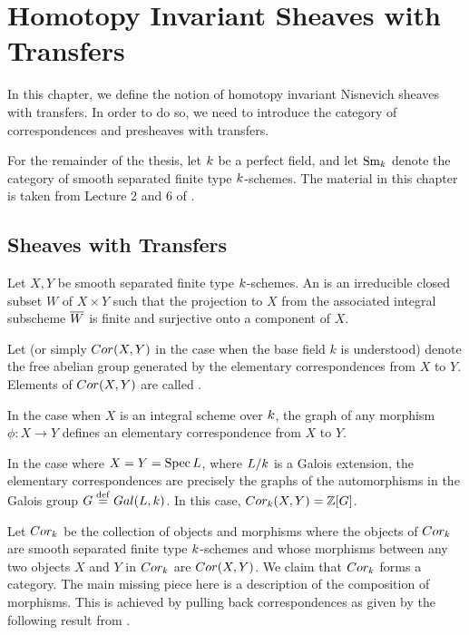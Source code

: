 \newpage
\chapter{Homotopy Invariant Sheaves with Transfers}\label{sect_hist}

In this chapter, we define the notion of homotopy invariant
Nisnevich sheaves with transfers. In order to do so, we need to
introduce the category of correspondences and presheaves with 
transfers. 

For the remainder of the thesis, let $k$ be a perfect 
field, and let $\mathrm{Sm}_{k}$ denote the category of smooth separated 
finite type $k$-schemes. The material in this chapter is 
taken from Lecture 2 and 6 of \cite{MVW}.

\section{Sheaves with Transfers}

\begin{defn}\label{def_cor}
Let $X, Y$ be smooth separated finite type $k$-schemes. 
An  is an 
irreducible closed subset $W$ of $X \times Y$ such that the 
projection to $X$ from the associated integral subscheme $\overline{W}$ 
is finite and surjective onto a component of $X$.

Let  (or simply $Cor(X, Y)$ in the 
case when the base field $k$ is understood) denote the free 
abelian group generated by the elementary correspondences from 
$X$ to $Y$. Elements of $Cor(X, Y)$ are called .
\end{defn}

\begin{ex}
In the case when $X$ is an integral scheme over $k$, the 
graph of any morphism $\phi: X \to Y$ defines an elementary 
correspondence from $X$ to $Y$. 

In the case where $X = Y = \mathrm{Spec}\, L$, where $L/k$ is a 
Galois extension, the elementary correspondences are precisely the 
graphs of the automorphisms in the Galois group $G \stackrel{\mathrm{def}}{=} Gal(L, 
k)$. In this case, $Cor_{k}(X, Y) = \mathbb{Z}[G]$.
\end{ex}

Let $Cor_{k}$ be the collection of objects and morphisms
where the objects of $Cor_k$ are smooth separated finite type
$k$-schemes and whose morphisms between any two objects $X$
and $Y$ in $Cor_k$ are $Cor(X, Y)$. We claim that
$Cor_{k}$ forms a category. The main missing piece here is a
description of the composition of morphisms. This is achieved by
pulling back correspondences as given by the following result from
\cite[1.7]{MVW}.

